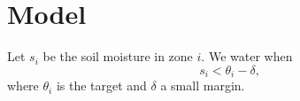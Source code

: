 \documentclass[../main.tex]{subfiles}
\begin{document}
\section{Model}
Let $s_i$ be the soil moisture in zone $i$. We water when
\begin{equation}
  s_i < \theta_i - \delta,
\end{equation}
where $\theta_i$ is the target and $\delta$ a small margin.
\end{document}
